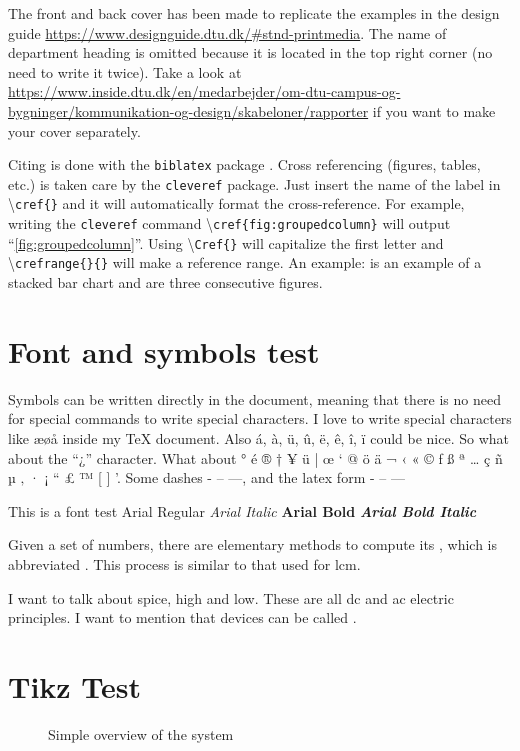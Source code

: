 The front and back cover has been made to replicate the examples in the design guide \url{https://www.designguide.dtu.dk/#stnd-printmedia}. The name of department heading is omitted because it is located in the top right corner (no need to write it twice). Take a look at \url{https://www.inside.dtu.dk/en/medarbejder/om-dtu-campus-og-bygninger/kommunikation-og-design/skabeloner/rapporter} if you want to make your cover separately. 

Citing is done with the \texttt{biblatex} package \cite{biblatex}. Cross referencing (figures, tables, etc.) is taken care by the \texttt{cleveref} package. Just insert the name of the label in \textbackslash \texttt{cref\{\}} and it will automatically format the cross-reference. For example, writing the \texttt{cleveref} command \textbackslash \texttt{cref\{fig:groupedcolumn\}} will output ``\cref{fig:groupedcolumn}''. Using \textbackslash \texttt{Cref\{\}} will capitalize the first letter and \textbackslash \texttt{crefrange\{\}\{\}} will make a reference range. An example:  is an example of a stacked bar chart and  are three consecutive figures.

\section{Font and symbols test}
Symbols can be written directly in the document, meaning that there is no need for special commands to write special characters. I love to write special characters like æøå inside my \TeX{} document. Also á, à, ü, û, ë, ê, î, ï could be nice. So what about the ``¿'' character. What about ° é ® † ¥ ü | œ ‘ @ ö ä ¬ ‹ « © ƒ ß ª … ç ñ µ ‚ · ¡ “ £ ™ [ ] '. Some dashes - – —, and the latex form - -- --- 

This is a font test \newline 
Arial Regular \newline 
\textit{Arial Italic} \newline 
\textbf{Arial Bold} \newline 
\textbf{\textit{Arial Bold Italic}}


Given a set of numbers, there are elementary methods to compute 
its , which is abbreviated . This 
process is similar to that used for \acrfull{lcm}.

I want to talk about \gls{spice}, \gls{high} and \gls{low}. These are all \gls{dc} and \gls{ac} electric principles. I want to mention that  devices can be called .

\section{Tikz Test}

\begin{figure}[h]
	\centering
	\resizebox{\textwidth}{!}{
		
	}
	\caption{Simple overview of the system}
	\label{fig:system_overview}
\end{figure}
